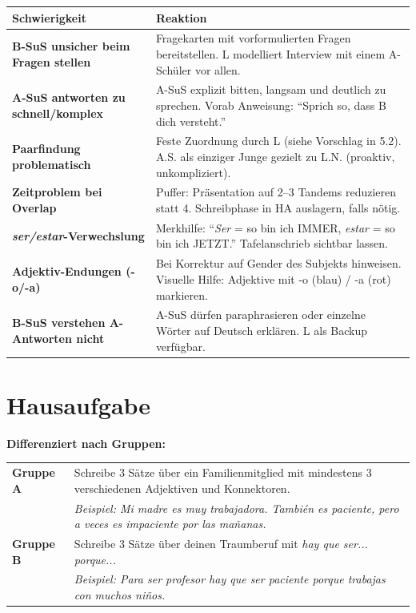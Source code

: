 \documentclass[11pt,a4paper]{article}
\begin{document}
\begin{tabular}{|p{4.5cm}|p{8.5cm}|}
\hline
\textbf{Schwierigkeit} & \textbf{Reaktion} \\
\hline
\textbf{B-SuS unsicher beim Fragen stellen} & Fragekarten mit vorformulierten Fragen bereitstellen. L modelliert Interview mit einem A-Schüler vor allen. \\
\hline
\textbf{A-SuS antworten zu schnell/komplex} & A-SuS explizit bitten, langsam und deutlich zu sprechen. Vorab Anweisung: ``Sprich so, dass B dich versteht.'' \\
\hline
\textbf{Paarfindung problematisch} & Feste Zuordnung durch L (siehe Vorschlag in 5.2). A.S. als einziger Junge gezielt zu L.N. (proaktiv, unkompliziert). \\
\hline
\textbf{Zeitproblem bei Overlap} & Puffer: Präsentation auf 2--3 Tandems reduzieren statt 4. Schreibphase in HA auslagern, falls nötig. \\
\hline
\textbf{\textit{ser/estar}-Verwechslung} & Merkhilfe: ``\textit{Ser} = so bin ich IMMER, \textit{estar} = so bin ich JETZT.'' Tafelanschrieb sichtbar lassen. \\
\hline
\textbf{Adjektiv-Endungen (-o/-a)} & Bei Korrektur auf Gender des Subjekts hinweisen. Visuelle Hilfe: Adjektive mit -o (blau) / -a (rot) markieren. \\
\hline
\textbf{B-SuS verstehen A-Antworten nicht} & A-SuS dürfen paraphrasieren oder einzelne Wörter auf Deutsch erklären. L als Backup verfügbar. \\
\hline
\end{tabular}

\section{Hausaufgabe}

\textbf{Differenziert nach Gruppen:}

\begin{tabular}{|l|p{10cm}|}
\hline
\textcolor{gruppeA}{\textbf{Gruppe A}} & Schreibe 3 Sätze über ein Familienmitglied mit mindestens 3 verschiedenen Adjektiven und Konnektoren. \\
& \textit{Beispiel: Mi madre es muy trabajadora. También es paciente, pero a veces es impaciente por las mañanas.} \\
\hline
\textcolor{gruppeB}{\textbf{Gruppe B}} & Schreibe 3 Sätze über deinen Traumberuf mit \textit{hay que ser... porque...} \\
& \textit{Beispiel: Para ser profesor hay que ser paciente porque trabajas con muchos niños.} \\
\hline
\end{tabular}
\end{document}
